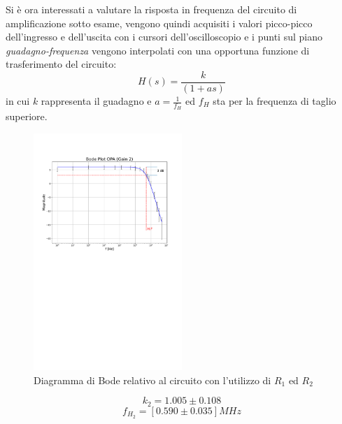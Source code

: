 \documentclass[journal]{IEEEtran}
\begin{document}
Si è ora interessati a valutare la risposta in frequenza del circuito di amplificazione sotto esame, vengono quindi acquisiti i valori picco-picco dell'ingresso e dell'uscita con i cursori dell'oscilloscopio e i punti sul piano \textit{guadagno-frequenza} vengono interpolati con una opportuna funzione di trasferimento del circuito:
\[H(s)=\frac{k}{(1+as)}\] 
in cui $k$ rappresenta il guadagno e $a = \frac{1}{f_H}$ ed $f_H$ sta per la frequenza di taglio superiore.
\begin{figure}[H]%
\begin {center}
\includegraphics[width=0.50\textwidth]{analysis/output/OPA-bode_gain2(mag).pdf}
\caption{Diagramma di Bode relativo al circuito con l'utilizzo di $R_1$ ed $R_2$ }
\label{fig:gain2}
\end {center}
\end{figure}
\[k_2 = 1.005 \pm 0.108\] 
\[f_{H_2} = [ 0.590 \pm 0.035 ]MHz\]
\end{document}
